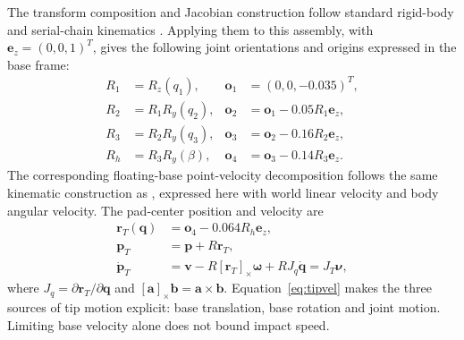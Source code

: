 \documentclass[conference]{IEEEtran}
\newcommand{\crossmat}[1]{[#1]_\times}
\begin{document}
The transform composition and Jacobian construction follow standard rigid-body and serial-chain kinematics \cite[chs.~3--5]{lynch2017}. Applying them to this assembly, with $\mathbf e_z=(0,0,1)^T$, gives the following joint orientations and origins expressed in the base frame:
\begin{align}
R_1&=R_z(q_1),& \mathbf o_1&=(0,0,-0.035)^T,\\
R_2&=R_1R_y(q_2),& \mathbf o_2&=\mathbf o_1-0.05R_1\mathbf e_z,\\
R_3&=R_2R_y(q_3),& \mathbf o_3&=\mathbf o_2-0.16R_2\mathbf e_z,\\
R_h&=R_3R_y(\beta),& \mathbf o_4&=\mathbf o_3-0.14R_3\mathbf e_z.
\end{align}
The corresponding floating-base point-velocity decomposition follows the same kinematic construction as \cite[Sec.~III-B, eqs.~(11)--(16)]{welde2020}, expressed here with world linear velocity and body angular velocity. The pad-center position and velocity are
\begin{align}
\mathbf r_T(\mathbf q)&=\mathbf o_4-0.064R_h\mathbf e_z,\\
\mathbf p_T&=\mathbf p+R\mathbf r_T,\label{eq:fk}\\
\dot{\mathbf p}_T&=\mathbf v-R\crossmat{\mathbf r_T}\boldsymbol\omega
 +RJ_q\dot{\mathbf q}=J_T\boldsymbol\nu,\label{eq:tipvel}
\end{align}
where $J_q=\partial\mathbf r_T/\partial\mathbf q$ and $\crossmat{\mathbf a}\mathbf b=\mathbf a\times\mathbf b$. Equation~\eqref{eq:tipvel} makes the three sources of tip motion explicit: base translation, base rotation and joint motion. Limiting base velocity alone does not bound impact speed.
\end{document}

